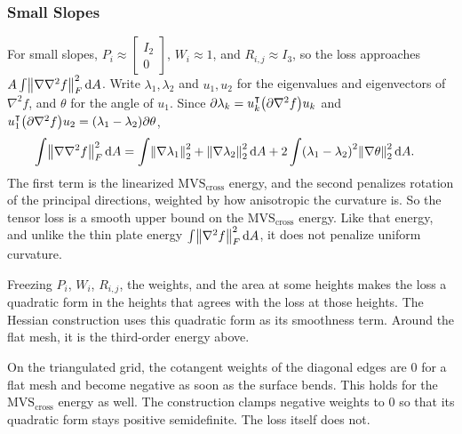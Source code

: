 \subsubsection{Small Slopes}
For small slopes, \(P_i \approx \begin{bmatrix} I_2 \\ 0 \end{bmatrix}\), \(W_i \approx 1\), and \(R_{i, j} \approx I_3\), so the loss approaches \(A \int \norm{\nabla \nabla^2 f}_F^2 \, \dif A\). Write \(\lambda_1, \lambda_2\) and \(u_1, u_2\) for the eigenvalues and eigenvectors of \(\nabla^2 f\), and \(\theta\) for the angle of \(u_1\). Since \(\partial \lambda_k = u_k^\intercal \pof{\partial \nabla^2 f} u_k\) and \(u_1^\intercal \pof{\partial \nabla^2 f} u_2 = \pof{\lambda_1 - \lambda_2} \partial \theta\), \begin{align*}
	\int \norm{\nabla \nabla^2 f}_F^2 \, \dif A &= \int \norm{\nabla \lambda_1}_2^2 + \norm{\nabla \lambda_2}_2^2 \, \dif A + 2 \int \pof{\lambda_1 - \lambda_2}^2 \norm{\nabla \theta}_2^2 \, \dif A.
\end{align*}
The first term is the linearized \(\text{MVS}_{\text{cross}}\) energy, and the second penalizes rotation of the principal directions, weighted by how anisotropic the curvature is. So the tensor loss is a smooth upper bound on the \(\text{MVS}_{\text{cross}}\) energy. Like that energy, and unlike the thin plate energy \(\int \norm{\nabla^2 f}_F^2 \, \dif A\), it does not penalize uniform curvature.

Freezing \(P_i\), \(W_i\), \(R_{i, j}\), the weights, and the area at some heights makes the loss a quadratic form in the heights that agrees with the loss at those heights. The Hessian construction uses this quadratic form as its smoothness term. Around the flat mesh, it is the third-order energy above.

On the triangulated grid, the cotangent weights of the diagonal edges are \(0\) for a flat mesh and become negative as soon as the surface bends. This holds for the \(\text{MVS}_{\text{cross}}\) energy as well. The construction clamps negative weights to \(0\) so that its quadratic form stays positive semidefinite. The loss itself does not.

